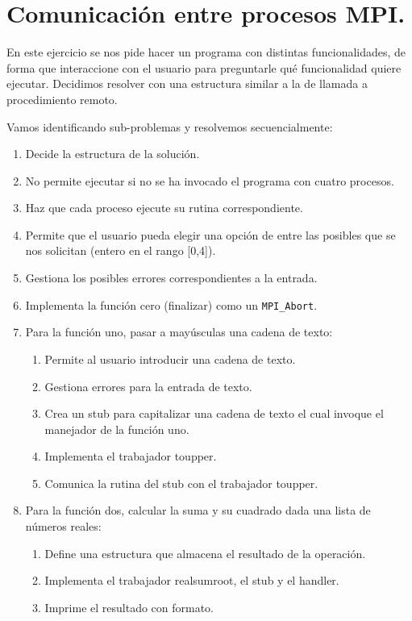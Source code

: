 \section{Comunicación entre procesos MPI.}
En este ejercicio se nos pide hacer un programa con distintas funcionalidades,
de forma que interaccione con el usuario para preguntarle qué funcionalidad quiere
ejecutar. Decidimos resolver con una estructura similar a la de llamada a procedimiento
remoto.

Vamos identificando sub-problemas y resolvemos secuencialmente:
\begin{enumerate}
    \item Decide la estructura de la solución.
    \item No permite ejecutar si no se ha invocado el programa con cuatro procesos.
    \item Haz que cada proceso ejecute su rutina correspondiente.
    \item Permite que el usuario pueda elegir una opción de entre las posibles que se nos solicitan (entero en el rango [0,4]).
    \item Gestiona los posibles errores correspondientes a la entrada.
    \item Implementa la función cero (finalizar) como un \texttt{MPI\_Abort}.
    \item Para la función uno, pasar a mayúsculas una cadena de texto:
    \begin{enumerate}
        \item Permite al usuario introducir una cadena de texto.
        \item Gestiona errores para la entrada de texto.
        \item Crea un stub para capitalizar una cadena de texto el cual invoque el manejador de la función uno.
        \item Implementa el trabajador toupper.
        \item Comunica la rutina del stub con el trabajador toupper.
    \end{enumerate}
    \item Para la función dos, calcular la suma y su cuadrado dada una lista de números reales:
    \begin{enumerate}
        \item Define una estructura que almacena el resultado de la operación.
        \item Implementa el trabajador realsumroot, el stub y el handler.
        \item Imprime el resultado con formato.

\end{enumerate}
\end{enumerate}
